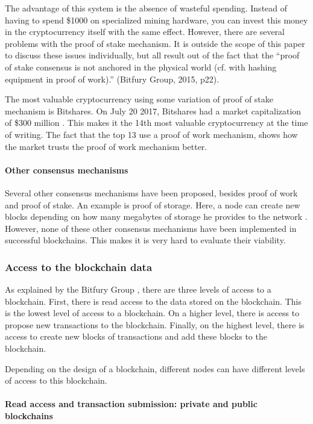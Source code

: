 The advantage of this system is the absence of wasteful spending. Instead of having to spend \$1000 on specialized mining hardware, you can invest this money in the cryptocurrency itself with the same effect. However, there are several problems with the proof of stake mechanism. It is outside the scope of this paper to discuss these issues individually, but all result out of the fact that the ``proof of stake consensus is not anchored in the physical world (cf. with hashing equipment in proof of work).'' (Bitfury Group, 2015, p22). 

The most valuable cryptocurrency using some variation of proof of stake mechanism is Bitshares. On July 20 2017, Bitshares had a market capitalization of \$300 million \cite{general-market-cap}. This makes it the 14th most valuable cryptocurrency at the time of writing. The fact that the top 13 use a proof of work mechanism, shows how the market trusts the proof of work mechanism better.

\paragraph{Other consensus mechanisms}

Several other consensus mechanisms have been proposed, besides proof of work and proof of stake. An example is proof of storage. Here, a node can create new blocks depending on how many megabytes of storage he provides to the network \cite{proof-of-whatever}. However, none of these other consensus mechanisms have been implemented in successful blockchains. This makes it is very hard to evaluate their viability. 

\subsubsection{Access to the blockchain data}

As explained by the Bitfury Group \cite{bitfury-permissioned}, there are three levels of access to a blockchain. First, there is read access to the data stored on the blockchain. This is the lowest level of access to a blockchain. On a higher level, there is access to propose new transactions to the blockchain. Finally, on the highest level, there is access to create new blocks of transactions and add these blocks to the blockchain.

Depending on the design of a blockchain, different nodes can have different levels of access to this blockchain.

\paragraph{Read access and transaction submission: private and public blockchains}

